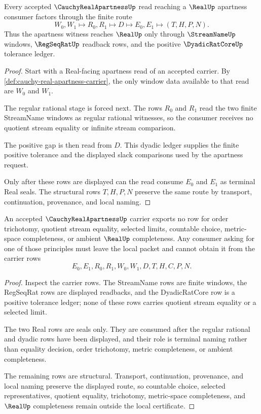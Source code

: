 \begin{theorem}
\label{thm:cauchy-real-apartness-regseqrat-handoff}
Every accepted $\CauchyRealApartnessUp$ read reaching a $\RealUp$ apartness consumer factors through the finite route
$$
W_0,W_1\longmapsto R_0,R_1\longmapsto D\longmapsto E_0,E_1\longmapsto (T,H,P,N).
$$
Thus the apartness witness reaches $\RealUp$ only through $\StreamNameUp$ windows, $\RegSeqRatUp$ readback rows, and the positive $\DyadicRatCoreUp$ tolerance ledger.
\end{theorem}
\begin{proof}
Start with a Real-facing apartness read of an accepted carrier. By \autoref{def:cauchy-real-apartness-carrier}, the only window data available to that read are $W_0$ and $W_1$.

The regular rational stage is forced next. The rows $R_0$ and $R_1$ read the two finite StreamName windows as regular rational witnesses, so the consumer receives no quotient stream equality or infinite stream comparison.

The positive gap is then read from $D$. This dyadic ledger supplies the finite positive tolerance and the displayed slack comparisons used by the apartness request.

Only after these rows are displayed can the read consume $E_0$ and $E_1$ as terminal Real seals. The structural rows $T,H,P,N$ preserve the same route by transport, continuation, provenance, and local naming.
\end{proof}

\begin{theorem}
\label{thm:cauchy-real-apartness-nonescape}
An accepted $\CauchyRealApartnessUp$ carrier exports no row for order trichotomy, quotient stream equality, selected limits, countable choice, metric-space completeness, or ambient $\RealUp$ completeness. Any consumer asking for one of those principles must leave the local packet and cannot obtain it from the carrier rows
$$
E_0,E_1,R_0,R_1,W_0,W_1,D,T,H,C,P,N .
$$
\end{theorem}
\begin{proof}
Inspect the carrier rows. The StreamName rows are finite windows, the RegSeqRat rows are displayed readbacks, and the DyadicRatCore row is a positive tolerance ledger; none of these rows carries quotient stream equality or a selected limit.

The two Real rows are seals only. They are consumed after the regular rational and dyadic rows have been displayed, and their role is terminal naming rather than equality decision, order trichotomy, metric completeness, or ambient completeness.

The remaining rows are structural. Transport, continuation, provenance, and local naming preserve the displayed route, so countable choice, selected representatives, quotient equality, trichotomy, metric-space completeness, and $\RealUp$ completeness remain outside the local certificate.
\end{proof}

